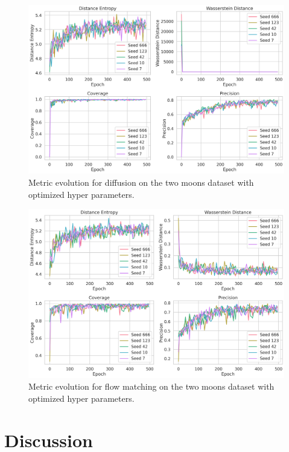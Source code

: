 \documentclass{article}
\begin{document}
\begin{figure}[tb]
    \includegraphics[width=\linewidth]{images/multiseed/diffusion_two_moons_metrics_comparison_optimized}
    \caption{Metric evolution for diffusion on the two moons dataset with optimized hyper parameters.}
    \label{fig:diffusion_two_moons_metrics_comparison_optimized}
\end{figure}

\begin{figure}[tb]
    \includegraphics[width=\linewidth]{images/multiseed/flow_matching_two_moons_metrics_comparison_optimized}
    \caption{Metric evolution for flow matching on the two moons dataset with optimized hyper parameters.}
    \label{fig:flow_matching_two_moons_metrics_comparison_optimized}
\end{figure}

\section{Discussion}
\end{document}
